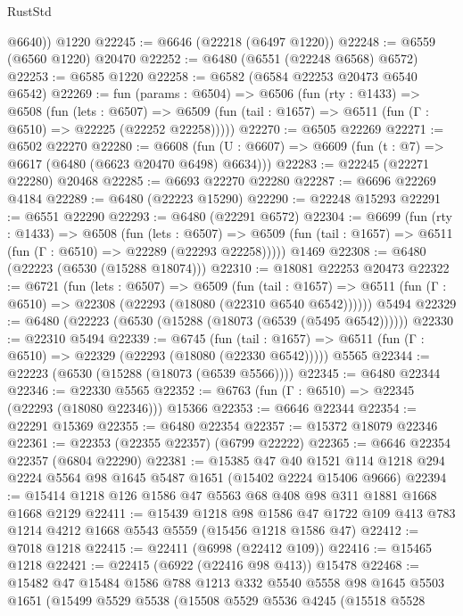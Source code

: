 \begin{lexlean}{RustStd}
\begin{coremodule}
        @6640))
    @1220
@22245 := @6646 (@22218 (@6497 @1220))
@22248 := @6559 (@6560 @1220) @20470
@22252 := @6480 (@6551 (@22248 @6568) @6572)
@22253 := @6585 @1220
@22258 := @6582 (@6584 @22253 @20473 @6540 @6542)
@22269 := fun (params : @6504) =>
  @6506
    (fun (rty : @1433) =>
    @6508
      (fun (lets : @6507) =>
      @6509 (fun (tail : @1657) => @6511 (fun (Γ : @6510) => @22225 (@22252 @22258)))))
@22270 := @6505 @22269
@22271 := @6502 @22270
@22280 := @6608
    (fun (U : @6607) => @6609 (fun (t : @7) => @6617 (@6480 (@6623 @20470 @6498) @6634)))
@22283 := @22245 (@22271 @22280) @20468
@22285 := @6693 @22270 @22280
@22287 := @6696 @22269 @4184
@22289 := @6480 (@22223 @15290)
@22290 := @22248 @15293
@22291 := @6551 @22290
@22293 := @6480 (@22291 @6572)
@22304 := @6699
    (fun (rty : @1433) =>
    @6508
      (fun (lets : @6507) =>
      @6509 (fun (tail : @1657) => @6511 (fun (Γ : @6510) => @22289 (@22293 @22258)))))
    @1469
@22308 := @6480 (@22223 (@6530 (@15288 @18074)))
@22310 := @18081 @22253 @20473
@22322 := @6721
    (fun (lets : @6507) =>
    @6509
      (fun (tail : @1657) =>
      @6511 (fun (Γ : @6510) => @22308 (@22293 (@18080 (@22310 @6540 @6542))))))
    @5494
@22329 := @6480 (@22223 (@6530 (@15288 (@18073 (@6539 (@5495 @6542))))))
@22330 := @22310 @5494
@22339 := @6745
    (fun (tail : @1657) => @6511 (fun (Γ : @6510) => @22329 (@22293 (@18080 (@22330 @6542)))))
    @5565
@22344 := @22223 (@6530 (@15288 (@18073 (@6539 @5566))))
@22345 := @6480 @22344
@22346 := @22330 @5565
@22352 := @6763 (fun (Γ : @6510) => @22345 (@22293 (@18080 @22346))) @15366
@22353 := @6646 @22344
@22354 := @22291 @15369
@22355 := @6480 @22354
@22357 := @15372 @18079 @22346
@22361 := @22353 (@22355 @22357) (@6799 @22222)
@22365 := @6646 @22354 @22357 (@6804 @22290)
@22381 := @15385
    @47
    @40
    @1521
    @114
    @1218
    @294
    @2224
    @5564
    @98
    @1645
    @5487
    @1651
    (@15402 @2224 @15406 @9666)
@22394 := @15414 @1218 @126 @1586 @47 @5563 @68 @408 @98 @311 @1881 @1668 @1668 @2129
@22411 := @15439
    @1218
    @98
    @1586
    @47
    @1722
    @109
    @413
    @783
    @1214
    @4212
    @1668
    @5543
    @5559
    (@15456 @1218 @1586 @47)
@22412 := @7018 @1218
@22415 := @22411 (@6998 (@22412 @109))
@22416 := @15465 @1218
@22421 := @22415 (@6922 (@22416 @98 @413)) @15478
@22468 := @15482
    @47
    @15484
    @1586
    @788
    @1213
    @332
    @5540
    @5558
    @98
    @1645
    @5503
    @1651
    (@15499
      @5529
      @5538
      (@15508
        @5529
        @5536
        @4245
        (@15518
          @5528

\end{coremodule}
\end{lexlean}

